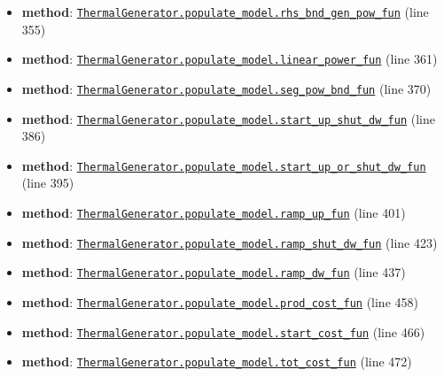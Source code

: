 \documentclass[11pt]{report}
\begin{document}
\begin{itemize}[leftmargin=*]
  \item \textbf{method}: \hyperref[def:examples-thermal_generator.py:ThermalGenerator.populate_model.rhs_bnd_gen_pow_fun:L355]{\texttt{ThermalGenerator.populate\_model.rhs\_bnd\_gen\_pow\_fun}} (line 355)
  \item \textbf{method}: \hyperref[def:examples-thermal_generator.py:ThermalGenerator.populate_model.linear_power_fun:L361]{\texttt{ThermalGenerator.populate\_model.linear\_power\_fun}} (line 361)
  \item \textbf{method}: \hyperref[def:examples-thermal_generator.py:ThermalGenerator.populate_model.seg_pow_bnd_fun:L370]{\texttt{ThermalGenerator.populate\_model.seg\_pow\_bnd\_fun}} (line 370)
  \item \textbf{method}: \hyperref[def:examples-thermal_generator.py:ThermalGenerator.populate_model.start_up_shut_dw_fun:L386]{\texttt{ThermalGenerator.populate\_model.start\_up\_shut\_dw\_fun}} (line 386)
  \item \textbf{method}: \hyperref[def:examples-thermal_generator.py:ThermalGenerator.populate_model.start_up_or_shut_dw_fun:L395]{\texttt{ThermalGenerator.populate\_model.start\_up\_or\_shut\_dw\_fun}} (line 395)
  \item \textbf{method}: \hyperref[def:examples-thermal_generator.py:ThermalGenerator.populate_model.ramp_up_fun:L401]{\texttt{ThermalGenerator.populate\_model.ramp\_up\_fun}} (line 401)
  \item \textbf{method}: \hyperref[def:examples-thermal_generator.py:ThermalGenerator.populate_model.ramp_shut_dw_fun:L423]{\texttt{ThermalGenerator.populate\_model.ramp\_shut\_dw\_fun}} (line 423)
  \item \textbf{method}: \hyperref[def:examples-thermal_generator.py:ThermalGenerator.populate_model.ramp_dw_fun:L437]{\texttt{ThermalGenerator.populate\_model.ramp\_dw\_fun}} (line 437)
  \item \textbf{method}: \hyperref[def:examples-thermal_generator.py:ThermalGenerator.populate_model.prod_cost_fun:L458]{\texttt{ThermalGenerator.populate\_model.prod\_cost\_fun}} (line 458)
  \item \textbf{method}: \hyperref[def:examples-thermal_generator.py:ThermalGenerator.populate_model.start_cost_fun:L466]{\texttt{ThermalGenerator.populate\_model.start\_cost\_fun}} (line 466)
  \item \textbf{method}: \hyperref[def:examples-thermal_generator.py:ThermalGenerator.populate_model.tot_cost_fun:L472]{\texttt{ThermalGenerator.populate\_model.tot\_cost\_fun}} (line 472)

\end{itemize}
\end{document}
